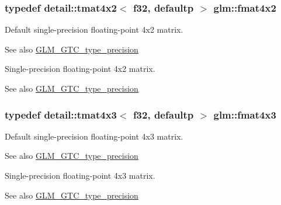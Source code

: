 \subsubsection[{\texorpdfstring{fmat4x2}{fmat4x2}}]{\setlength{\rightskip}{0pt plus 5cm}typedef detail\+::tmat4x2$<$ f32, defaultp $>$ {\bf glm\+::fmat4x2}}\hypertarget{group__gtc__type__precision_ga0cf4b66f4929b3c21ab7b967386fc7dd}{}\label{group__gtc__type__precision_ga0cf4b66f4929b3c21ab7b967386fc7dd}
Default single-\/precision floating-\/point 4x2 matrix. \begin{DoxySeeAlso}{See also}
\hyperlink{group__gtc__type__precision}{G\+L\+M\+\_\+\+G\+T\+C\+\_\+type\+\_\+precision}
\end{DoxySeeAlso}
Single-\/precision floating-\/point 4x2 matrix. \begin{DoxySeeAlso}{See also}
\hyperlink{group__gtc__type__precision}{G\+L\+M\+\_\+\+G\+T\+C\+\_\+type\+\_\+precision} 
\end{DoxySeeAlso}
\subsubsection[{\texorpdfstring{fmat4x3}{fmat4x3}}]{\setlength{\rightskip}{0pt plus 5cm}typedef detail\+::tmat4x3$<$ f32, defaultp $>$ {\bf glm\+::fmat4x3}}\hypertarget{group__gtc__type__precision_ga5af77d2574bca528d321fbf261c90107}{}\label{group__gtc__type__precision_ga5af77d2574bca528d321fbf261c90107}
Default single-\/precision floating-\/point 4x3 matrix. \begin{DoxySeeAlso}{See also}
\hyperlink{group__gtc__type__precision}{G\+L\+M\+\_\+\+G\+T\+C\+\_\+type\+\_\+precision}
\end{DoxySeeAlso}
Single-\/precision floating-\/point 4x3 matrix. \begin{DoxySeeAlso}{See also}
\hyperlink{group__gtc__type__precision}{G\+L\+M\+\_\+\+G\+T\+C\+\_\+type\+\_\+precision} 
\end{DoxySeeAlso}
